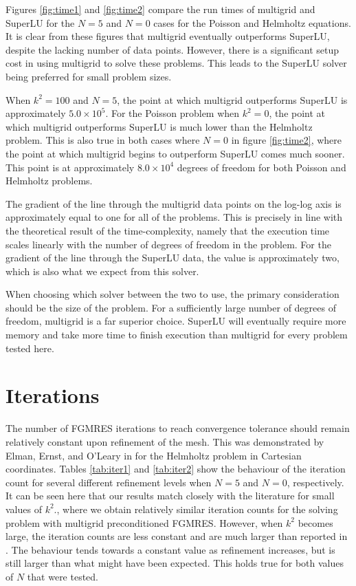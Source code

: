 Figures \ref{fig:time1} and \ref{fig:time2} compare the run times of multigrid and SuperLU for the $N=5$ and $N=0$ cases for the Poisson and Helmholtz equations.
It is clear from these figures that multigrid eventually outperforms SuperLU, despite the lacking number of data points.
However, there is a significant setup cost in using multigrid to solve these problems.
This leads to the SuperLU solver being preferred for small problem sizes.

When $k^2=100$ and $N=5$, the point at which multigrid outperforms SuperLU is approximately $5.0\times 10^5$.
For the Poisson problem when $k^2=0$, the point at which multigrid outperforms SuperLU is much lower than the Helmholtz problem.
This is also true in both cases where $N=0$ in figure \ref{fig:time2}, where the point at which multigrid begins to outperform SuperLU comes much sooner.
This point is at approximately $8.0\times 10^4$ degrees of freedom for both Poisson and Helmholtz problems.

The gradient of the line through the multigrid data points on the log-log axis is approximately equal to one for all of the problems.
This is precisely in line with the theoretical result of the time-complexity, namely that the execution time scales linearly with the number of degrees of freedom in the problem.
For the gradient of the line through the SuperLU data, the value is approximately two, which is also what we expect from this solver.

When choosing which solver between the two to use, the primary consideration should be the size of the problem.
For a sufficiently large number of degrees of freedom, multigrid is a far superior choice.
SuperLU will eventually require more memory and take more time to finish execution than multigrid for every problem tested here.









\section{Iterations}

The number of FGMRES iterations to reach convergence tolerance should remain relatively constant upon refinement of the mesh.
This was demonstrated by Elman, Ernst, and O'Leary in \cite{elman} for the Helmholtz problem in Cartesian coordinates.
Tables \ref{tab:iter1} and \ref{tab:iter2} show the behaviour of the iteration count for several different refinement levels when $N=5$ and $N=0$, respectively.
It can be seen here that our results match closely with the literature for small values of $k^2$., where we obtain relatively similar iteration counts for the solving problem with multigrid preconditioned FGMRES.
However, when $k^2$ becomes large, the iteration counts are less constant and are much larger than reported in \cite{elman}.
The behaviour tends towards a constant value as refinement increases, but is still larger than what might have been expected.
This holds true for both values of $N$ that were tested.


